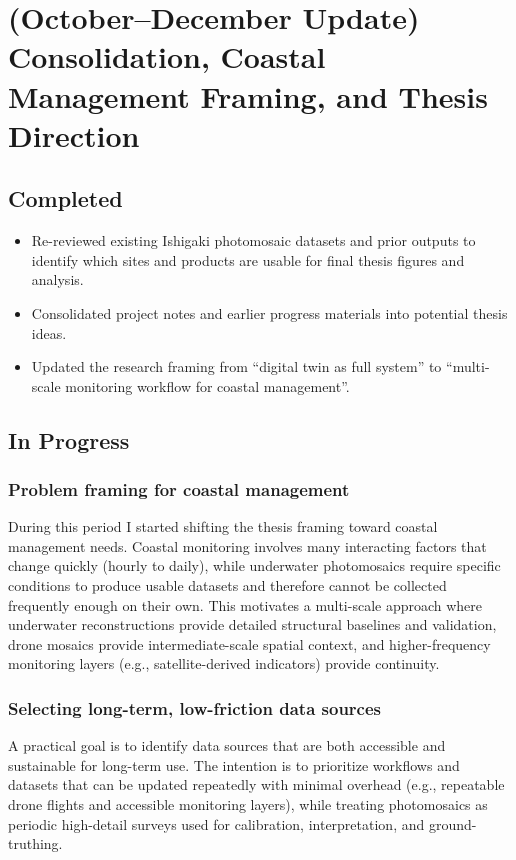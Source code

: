 \documentclass[a4paper,12pt]{article}
\begin{document}
\section{(October--December Update) Consolidation, Coastal Management Framing, and Thesis Direction}


\subsection{Completed}
\begin{itemize}
    \item Re-reviewed existing Ishigaki photomosaic datasets and prior outputs to identify which sites and products are usable for final thesis figures and analysis.
    \item Consolidated project notes and earlier progress materials into potential thesis ideas.
    \item Updated the research framing from ``digital twin as full system'' to ``multi-scale monitoring workflow for coastal management''.
\end{itemize}

\subsection{In Progress}
\subsubsection{Problem framing for coastal management}
During this period I started shifting the thesis framing toward coastal management needs. Coastal monitoring involves many interacting factors that change quickly (hourly to daily), while underwater photomosaics require specific conditions to produce usable datasets and therefore cannot be collected frequently enough on their own. This motivates a multi-scale approach where underwater reconstructions provide detailed structural baselines and validation, drone mosaics provide intermediate-scale spatial context, and higher-frequency monitoring layers (e.g., satellite-derived indicators) provide continuity.

\subsubsection{Selecting long-term, low-friction data sources}
A practical goal is to identify data sources that are both accessible and sustainable for long-term use. The intention is to prioritize workflows and datasets that can be updated repeatedly with minimal overhead (e.g., repeatable drone flights and accessible monitoring layers), while treating photomosaics as periodic high-detail surveys used for calibration, interpretation, and ground-truthing.
\end{document}
